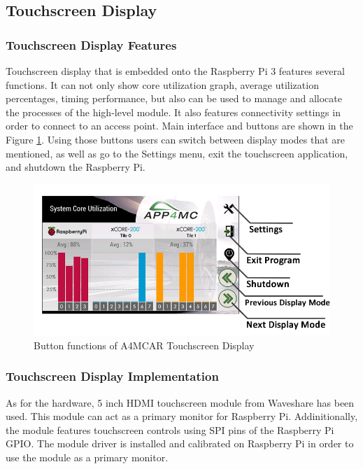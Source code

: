 \subsection{Touchscreen Display}
\subsubsection{Touchscreen Display Features}
Touchscreen display that is embedded onto the Raspberry Pi 3 features several functions. It can not only show core utilization graph, average utilization percentages, timing performance, but also can be used to manage and allocate the processes of the high-level module. It also features connectivity settings in order to connect to an access point. Main interface and buttons are shown in the Figure \ref{fig:displaybuttons}. Using those buttons users can switch between display modes that are mentioned, as well as go to the Settings menu, exit the touchscreen application, and shutdown the Raspberry Pi. 
\begin{figure}[!ht]
	\centering
	\includegraphics[scale=0.5]{content/images/displaybuttons.png}
	\caption{Button functions of A4MCAR Touchscreen Display}
	\label{fig:displaybuttons}
\end{figure}

\subsubsection{Touchscreen Display Implementation}
As for the hardware, 5 inch HDMI touchscreen module from Waveshare has been used. This module can act as a primary monitor for Raspberry Pi. Addinitionally, the module features touchscreen controls using SPI pins of the Raspberry Pi GPIO. The module driver is installed and calibrated on Raspberry Pi in order to use the module as a primary monitor. 

